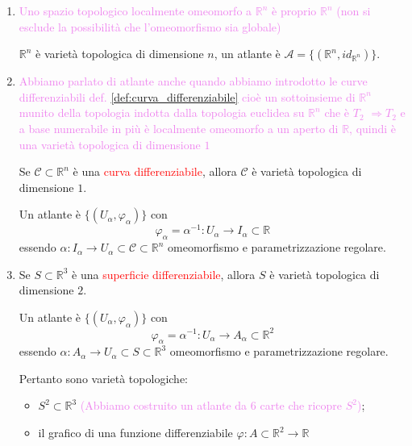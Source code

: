         \begin{esempio}
        \mbox{}

        \begin{enumerate}[label=\arabic*)]
            \item \textcolor{violet}{Uno spazio topologico localmente omeomorfo a $\mathbb{R}^n$ è proprio $\mathbb{R}^n$ (non si esclude la possibilità che l'omeomorfismo sia globale)} 
    
            $\mathbb{R}^n$ è varietà topologica di dimensione $n$, un atlante è $\mathcal{A} = \{(\mathbb{R}^n, id_{\mathbb{R}^n})\}$.
            \item \textcolor{violet}{Abbiamo parlato di atlante anche quando abbiamo introdotto le curve differenziabili def. \ref{def:curva_differenziabile} cioè un sottoinsieme
            di $\mathbb{R}^n$ munito della topologia indotta dalla topologia euclidea su $\mathbb{R}^n$ che è $T_2$ $\Rightarrow T_2$ e a base 
            numerabile in più è localmente omeomorfo a un aperto di $\mathbb{R}$, quindi è una varietà topologica di dimensione $1$}
            
            Se $\mathcal{C} \subset \mathbb{R}^n$ è una \textcolor{red}{curva differenziabile}, allora $\mathcal{C}$ è varietà topologica di dimensione $1$.
            
            Un atlante è $\{(U_\alpha, \varphi_\alpha)\}$ con
            \[
            \varphi_\alpha = \alpha^{-1} : U_\alpha \to I_\alpha \subset \mathbb{R}
            \]
            essendo $\alpha : I_\alpha \to U_\alpha \subset \mathcal{C} \subset \mathbb{R}^n$ omeomorfismo e parametrizzazione regolare.
            \newpage
            \item Se $S \subset \mathbb{R}^3$ è una \textcolor{red}{superficie differenziabile}, allora $S$ è varietà topologica di dimensione $2$.
            
            Un atlante è $\{(U_\alpha, \varphi_\alpha)\}$ con
            \[
            \varphi_\alpha = \alpha^{-1} : U_\alpha \to A_\alpha \subset \mathbb{R}^2
            \]
            essendo $\alpha : A_\alpha \to U_\alpha \subset S \subset \mathbb{R}^3$ omeomorfismo e parametrizzazione regolare.
            
            Pertanto sono varietà topologiche:
            \begin{itemize}
                \item $S^2 \subset \mathbb{R}^3$ \textcolor{violet}{(Abbiamo costruito un atlante da $6$ carte che ricopre $S^2$)};
                \item il grafico di una funzione differenziabile $\varphi : A \subset \mathbb{R}^2 \to \mathbb{R}$ 
                

\end{itemize}
\end{enumerate}
\end{esempio}
